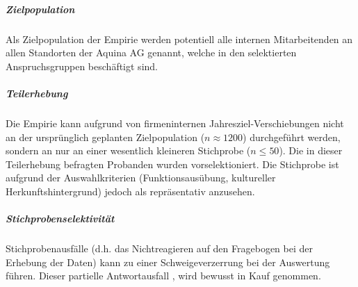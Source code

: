\documentclass[../../main.tex]{subfiles}
\begin{document}
\subparagraph*{Zielpopulation}\mbox{}

\begin{sloppypar}
Als Zielpopulation der Empirie werden potentiell alle internen Mitarbeitenden an allen Standorten der Aquina AG genannt, welche in den selektierten Anspruchsgruppen beschäftigt sind.
\end{sloppypar}

\subparagraph*{Teilerhebung}\mbox{}

\begin{sloppypar}
Die Empirie kann aufgrund von firmeninternen Jahresziel-Verschiebungen nicht an der ursprünglich geplanten Zielpopulation ($n \approx 1200$) durchgeführt werden, sondern an nur an einer wesentlich kleineren Stichprobe ($n \leq 50$). Die in dieser Teilerhebung befragten Probanden wurden vorselektioniert. Die Stichprobe ist aufgrund der Auswahlkriterien (Funktionsausübung, kultureller Herkunftshintergrund) jedoch als repräsentativ anzusehen.
\end{sloppypar}

\subparagraph*{Stichprobenselektivität}\mbox{}

\begin{sloppypar}
Stichprobenausfälle (d.h. das Nichtreagieren auf den Fragebogen bei der Erhebung der Daten) kann zu einer Schweigeverzerrung bei der Auswertung führen. Dieser partielle Antwortausfall , wird bewusst in Kauf genommen. 
\end{sloppypar}
\end{document}
